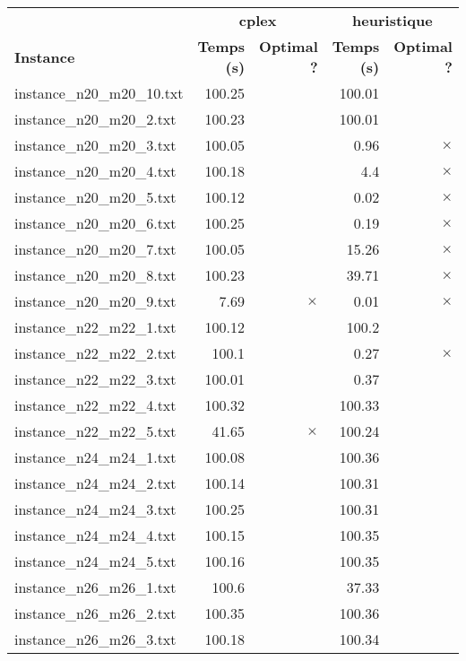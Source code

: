\documentclass{article}
\begin{document}
\newpage
\begin{center}
\renewcommand{\arraystretch}{1.4} 
 \begin{tabular}{lrrrr}
	\hline
 & \multicolumn{2}{c}{\textbf{cplex}} & \multicolumn{2}{c}{\textbf{heuristique}}\\
\textbf{Instance}  & \textbf{Temps (s)} & \textbf{Optimal ?}  & \textbf{Temps (s)} & \textbf{Optimal ?} \\\hline

instance\_n20\_m20\_10.txt & 100.25 & 
 & 100.01 & 
\\
instance\_n20\_m20\_2.txt & 100.23 & 
 & 100.01 & 
\\
instance\_n20\_m20\_3.txt & 100.05 & 
 & 0.96 & 
$\times$
\\
instance\_n20\_m20\_4.txt & 100.18 & 
 & 4.4 & 
$\times$
\\
instance\_n20\_m20\_5.txt & 100.12 & 
 & 0.02 & 
$\times$
\\
instance\_n20\_m20\_6.txt & 100.25 & 
 & 0.19 & 
$\times$
\\
instance\_n20\_m20\_7.txt & 100.05 & 
 & 15.26 & 
$\times$
\\
instance\_n20\_m20\_8.txt & 100.23 & 
 & 39.71 & 
$\times$
\\
instance\_n20\_m20\_9.txt & 7.69 & 
$\times$
 & 0.01 & 
$\times$
\\
instance\_n22\_m22\_1.txt & 100.12 & 
 & 100.2 & 
\\
instance\_n22\_m22\_2.txt & 100.1 & 
 & 0.27 & 
$\times$
\\
instance\_n22\_m22\_3.txt & 100.01 & 
 & 0.37 & 
\\
instance\_n22\_m22\_4.txt & 100.32 & 
 & 100.33 & 
\\
instance\_n22\_m22\_5.txt & 41.65 & 
$\times$
 & 100.24 & 
\\
instance\_n24\_m24\_1.txt & 100.08 & 
 & 100.36 & 
\\
instance\_n24\_m24\_2.txt & 100.14 & 
 & 100.31 & 
\\
instance\_n24\_m24\_3.txt & 100.25 & 
 & 100.31 & 
\\
instance\_n24\_m24\_4.txt & 100.15 & 
 & 100.35 & 
\\
instance\_n24\_m24\_5.txt & 100.16 & 
 & 100.35 & 
\\
instance\_n26\_m26\_1.txt & 100.6 & 
 & 37.33 & 
\\
instance\_n26\_m26\_2.txt & 100.35 & 
 & 100.36 & 
\\
instance\_n26\_m26\_3.txt & 100.18 & 
 & 100.34 & 
\\

\end{tabular}
\end{center}
\end{document}
